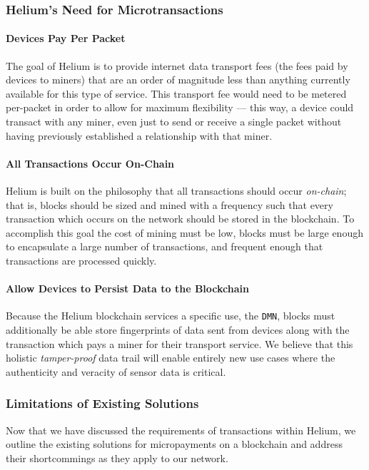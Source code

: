 \documentclass[UTF8, 10pt, nonatbib, nocopyrightspace, reprint]{sigplanconf}
\begin{document}
\subsubsection{Helium's Need for Microtransactions}

\paragraph{Devices Pay Per Packet}
The goal of Helium is to provide internet data transport fees (the fees paid by devices to miners) that are an order of magnitude less than anything currently available for this type of service. This transport fee would need to be metered per-packet in order to allow for maximum flexibility --- this way, a device could transact with any miner, even just to send or receive a single packet without having previously established a relationship with that miner.

\paragraph{All Transactions Occur On-Chain}
Helium is built on the philosophy that all transactions should occur \emph{on-chain}; that is, blocks should be sized and mined with a frequency such that every transaction which occurs on the network should be stored in the blockchain.  To accomplish this goal the cost of mining must be low, blocks must be large enough to encapsulate a large number of transactions, and frequent enough that transactions are processed quickly.

\paragraph{Allow Devices to Persist Data to the Blockchain}
Because the Helium blockchain services a specific use, the \verb|DMN|, blocks must additionally be able store fingerprints of data sent from devices along with the transaction which pays a miner for their transport service.  We believe that this holistic \emph{tamper-proof} data trail will enable entirely new use cases where the authenticity and veracity of sensor data is critical.

\subsubsection{Limitations of Existing Solutions}

Now that we have discussed the requirements of transactions within Helium, we outline the existing solutions for micropayments on a blockchain and address their shortcommings as they apply to our network.
\end{document}
